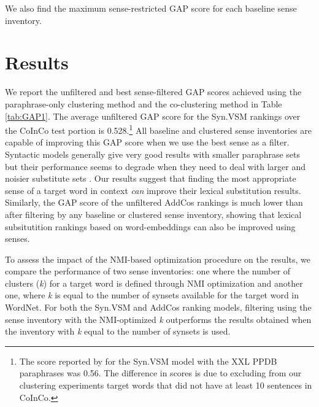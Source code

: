 \documentclass[11pt]{article}
\begin{document}
\noindent We also find the maximum sense-restricted GAP score for each baseline sense inventory.


\section{Results}

We report the unfiltered and best sense-filtered GAP scores achieved using the paraphrase-only clustering method %
and the co-clustering method in Table \ref{tab:GAP1}. 
The average unfiltered GAP score for the Syn.VSM rankings over the CoInCo test portion is 0.528.\footnote{The score reported by  for the Syn.VSM model with the XXL PPDB paraphrases was 0.56. The difference in scores is due to excluding from our clustering experiments target words that did not have at least 10 sentences in CoInCo.}  All baseline and clustered sense inventories are capable of improving this GAP score when we use the best sense as a filter. Syntactic models generally give very good results with smaller paraphrase sets \cite{kremer-EtAl:2014:EACL} but their performance seems to degrade when they need to deal with larger and noisier substitute sets \cite{apidianaki:2016:EMNLP2016}. Our results suggest that finding the most appropriate sense of a target word in context \textit{can} improve their lexical substitution results. Similarly, the GAP score of the unfiltered AddCos rankings is much lower than after filtering by any baseline or clustered sense inventory, showing that lexical subsitutition rankings based on word-embeddings can also be improved using senses. 

To assess the impact of the NMI-based optimization procedure on the results, we compare the performance of two sense inventories: one where the number of clusters (\textit{k}) for a target word is defined through NMI optimization  and another one, where \textit{k} is equal to the number of synsets available for the target word in WordNet. For both the Syn.VSM and AddCos ranking models, filtering using the sense inventory with the NMI-optimized \textit{k} outperforms the results obtained when the inventory with \textit{k} equal to the number of  synsets is used. 

\end{document}
